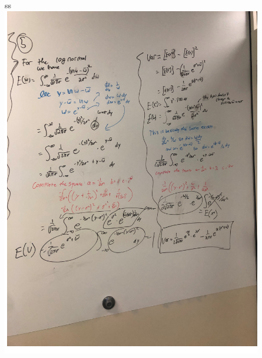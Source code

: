 \documentclass[12pt]{article}
\newenvironment{problem}[3][Problem]{\begin{trivlist}
\item[\hskip \labelsep {\bfseries #1}\hskip \labelsep {\bfseries #2.}]}{\end{trivlist}}
\begin{document}
  \begin{problem}{5} .ss \\
\includegraphics[width=\textwidth ]{mod10p5c.png}

  \end{problem}
  
\end{document}
